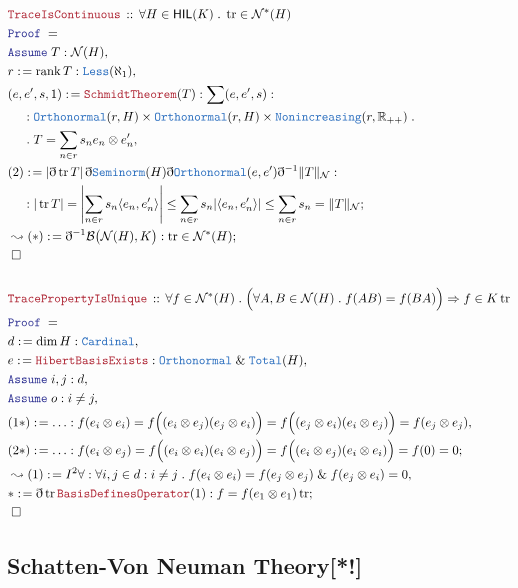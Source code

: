 \documentclass[12pt]{scrartcl}
\newcommand{\TYPE}[1]{\textcolor{NavyBlue}{\mathtt{#1}}}
\newcommand{\LOGIC}[1]{\textcolor{Blue}{\mathtt{#1}}}
\newcommand{\THM}[1]{\textcolor{Maroon}{\mathtt{#1}}}
\renewcommand{\.}{\; . \;}
\newcommand{\de}{: \kern 0.1pc =}
\newcommand{\Theorem}[2]{& \THM{#1} \, :: \, #2 \\ & \Proof = \\ }
\newcommand{\NewLine}{\\ & \kern 1pc}
\newcommand{\Page}[1]{\begin{align*} #1 \end{align*} \newpage   }
\newcommand{ \bd }{ \ByDef }
\renewcommand{\And}{\; \& \;}
\newcommand{\Reals}{\mathbb{R} }
\newcommand{\Say}[3]{& #1 \de #2 : #3, \\}
\newcommand{\Conclude}[3]{& #1 \de #2 : #3; \\}
\newcommand{\Derive}[3]{& \leadsto #1 \de #2 : #3, \\}
\newcommand{\DeriveConclude}[3]{& \leadsto #1 \de #2 : #3 ; \\}
\newcommand{\A}{\LOGIC{Assume} \;}
\newcommand{\Assume}[2]{& \A #1 : #2, \\}
\newcommand{\QED}{\; \square}
\newcommand{\EndProof}{& \QED \\}
\newcommand{\ByDef}{\eth}
\newcommand{\Proof}{\LOGIC{Proof} \; }
\DeclareMathOperator*{\rank}{rank}
\DeclareMathOperator{\tr}{tr}
\newcommand{\HIL}{\mathsf{HIL}} %
\newcommand{\N}{\mathcal{N}}
\newcommand{\B}{\mathcal{B}}
\begin{document}
{} \Page{
	\Theorem{TraceIsContinuous}{\forall H \in \HIL(K) \. \tr \in \N^*(H)}
	\Assume{T}{\N(H)}
	\Say{r }{\rank T}{ \TYPE{Less}(\aleph_1 )}
	\Say{(e,e',s,1)}{\THM{SchmidtTheorem}(T)}{ \sum (e,e',s) : 
		\NewLine :
		\TYPE{Orthonormal}(r,H) \times \TYPE{Orthonormal}(r,H)
		\times \TYPE{Nonincreasing}(r,\Reals_{++}) \.
		\NewLine \. T  = \sum_{n \in r} s_n e_n \otimes e'_n 
	}
	\Conclude{(2)}{ \left| \bd \tr T \right| \bd \TYPE{Seminorm}(H) \bd \TYPE{Orthonormal}(e,e')\bd^{-1} \|T\|_\N  }{    
		\NewLine :
		| \tr T | =  
		\left| \sum_{n \in r} s_n \langle e_n,e'_n \rangle  \right| \le 
		\sum_{n \in r}  s_n | \langle  e_n, e'_n  \rangle    | \le \sum_{n \in r} s_n 
		= \| T \|_\N
	}
	\DeriveConclude{(*)}{\bd^{-1} \B\big(\N(H),K\big)}{\tr \in \N^*(H)}
	\EndProof
 	\\
	\Theorem{TracePropertyIsUnique}{ \forall f \in \N^*(H) \. \Big( \forall A,B \in \N(H) \. f(AB) = f(BA) \Big) \Rightarrow
	 f \in K \tr  
	}
	\Say{d}{\dim H}{\TYPE{Cardinal}}
	\Say{e}{\THM{HibertBasisExists}}{\TYPE{Orthonormal} \And \TYPE{Total}(H)}
	\Assume{i,j}{d}
	\Assume{o}{i \neq j}
	\Say{(1*)}{\ldots}{ f( e_i \otimes e_i   ) = 
		f\Big((e_i \otimes e_j) (e_j \otimes e_i)\Big) =  
		f\Big((e_j \otimes e_i) (e_i \otimes e_j)\Big) =
		f(e_j \otimes e_j) 
	}
      \Conclude{(2*)}{\ldots}{ 
      f(e_i \otimes e_j) = 
      f\Big((e_i \otimes e_i)(e_i \otimes e_j)\Big) =
      f\Big( (e_i \otimes e_j)(e_i \otimes e_i) \Big) =
      f(0) = 0
      }
      \Derive{(1)}{I^2{\forall}}{ \forall i,j \in d : i \neq j \. f(e_i \otimes e_i) = f(e_j \otimes e_j)
      \And f(e_j \otimes e_i) = 0
      }
      \Conclude{*}{\bd \tr \THM{BasisDefinesOperator}(1)}{ f = f(e_1 \otimes e_1)\tr  }
      \EndProof
}
\subsection{Schatten-Von Neuman Theory[*!]}
\Page{
	}
\end{document}
